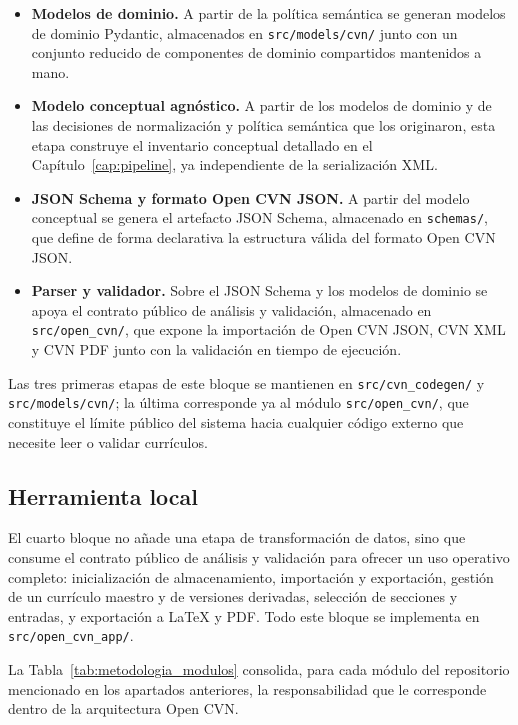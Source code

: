 \begin{itemize}
  \item \textbf{Modelos de dominio.} A partir de la política semántica se
  generan modelos de dominio Pydantic, almacenados en \texttt{src/models/cvn/}
  junto con un conjunto reducido de componentes de dominio compartidos
  mantenidos a mano.

  \item \textbf{Modelo conceptual agnóstico.} A partir de los modelos de
  dominio y de las decisiones de normalización y política semántica que los
  originaron, esta etapa construye el inventario conceptual detallado en el
  Capítulo~\ref{cap:pipeline}, ya independiente de la serialización XML.

  \item \textbf{JSON Schema y formato Open CVN JSON.} A partir del modelo
  conceptual se genera el artefacto JSON Schema, almacenado en
  \texttt{schemas/}, que define de forma declarativa la estructura válida del
  formato Open CVN JSON.

  \item \textbf{Parser y validador.} Sobre el JSON Schema y los modelos de
  dominio se apoya el contrato público de análisis y validación, almacenado en
  \texttt{src/open\_cvn/}, que expone la importación de Open CVN JSON, CVN XML
  y CVN PDF junto con la validación en tiempo de ejecución.
\end{itemize}

Las tres primeras etapas de este bloque se mantienen en
\texttt{src/cvn\_codegen/} y \texttt{src/models/cvn/}; la última corresponde ya
al módulo \texttt{src/open\_cvn/}, que constituye el límite público del
sistema hacia cualquier código externo que necesite leer o validar currículos.

\subsection{Herramienta local}
\label{sec:metodologia_arquitectura_herramienta}

El cuarto bloque no añade una etapa de transformación de datos, sino que
consume el contrato público de análisis y validación para ofrecer un uso
operativo completo: inicialización de almacenamiento, importación y
exportación, gestión de un currículo maestro y de versiones derivadas,
selección de secciones y entradas, y exportación a LaTeX y PDF. Todo este
bloque se implementa en \texttt{src/open\_cvn\_app/}.

La Tabla~\ref{tab:metodologia_modulos} consolida, para cada módulo del
repositorio mencionado en los apartados anteriores, la responsabilidad que le
corresponde dentro de la arquitectura Open CVN.

